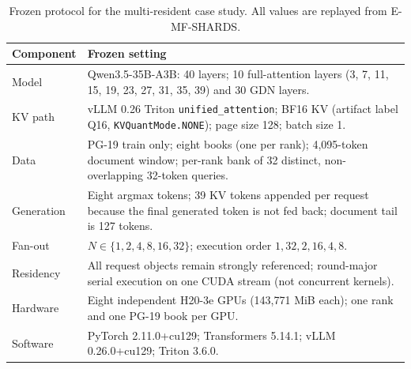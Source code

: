 \begin{table}[H]
\caption{Frozen protocol for the multi-resident case study. All values are replayed from E-MF-SHARDS.}
\label{tab:protocol}
\centering
\small
\setlength{\tabcolsep}{3.5pt}
\begin{tabular}{@{}p{}p{}@{}}
\toprule
Component & Frozen setting \\
\midrule
Model & Qwen3.5-35B-A3B: 40 layers; 10 full-attention layers (3, 7, 11, 15, 19, 23, 27, 31, 35, 39) and 30 GDN layers. \\
KV path & vLLM 0.26 Triton \texttt{unified\_attention}; BF16 KV (artifact label Q16, \texttt{KVQuantMode.NONE}); page size 128; batch size 1. \\
Data & PG-19 train only; eight books (one per rank); 4,095-token document window; per-rank bank of 32 distinct, non-overlapping 32-token queries. \\
Generation & Eight argmax tokens; 39 KV tokens appended per request because the final generated token is not fed back; document tail is 127 tokens. \\
Fan-out & $N\in\{1,2,4,8,16,32\}$; execution order $1,32,2,16,4,8$. \\
Residency & All request objects remain strongly referenced; round-major serial execution on one CUDA stream (not concurrent kernels). \\
Hardware & Eight independent H20-3e GPUs (143,771 MiB each); one rank and one PG-19 book per GPU. \\
Software & PyTorch 2.11.0+cu129; Transformers 5.14.1; vLLM 0.26.0+cu129; Triton 3.6.0. \\
\bottomrule
\end{tabular}
\end{table}
